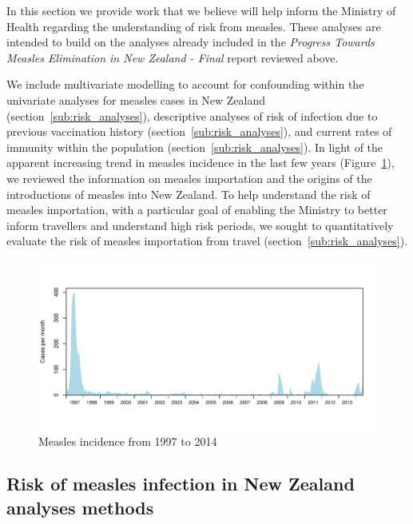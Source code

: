 \documentclass{article}
\begin{document}
In this section we provide work that we believe will help inform the Ministry of Health regarding the understanding of risk from measles. These analyses are intended to build on the analyses already included in the \emph {Progress Towards Measles Elimination in New Zealand - Final} report reviewed above.

We include multivariate modelling to account for confounding within the univariate analyses for measles cases in New Zealand (section~\ref{sub:risk_analyses}), descriptive analyses of risk of infection due to previous vaccination history (section~\ref{sub:risk_analyses}), and current rates of immunity within the population (section~\ref{sub:risk_analyses}). In light of the apparent increasing trend in measles incidence in the last few years (Figure~\ref{fig:incidence1997}), we reviewed the information on measles importation and the origins of the introductions of measles into New Zealand. To help understand the risk of measles importation, with a particular goal of enabling the Ministry to better inform travellers and understand high risk periods, we sought to quantitatively evaluate the risk of measles importation from travel (section~\ref{sub:risk_analyses}).

\begin{figure}
     \centering
     \includegraphics[width=1\textwidth]{incidence_1997_2014.pdf}
     \caption{Measles incidence from 1997 to 2014}
     \label{fig:incidence1997}
\end{figure}

\subsection{Risk of measles infection in New Zealand analyses methods}
\end{document}
